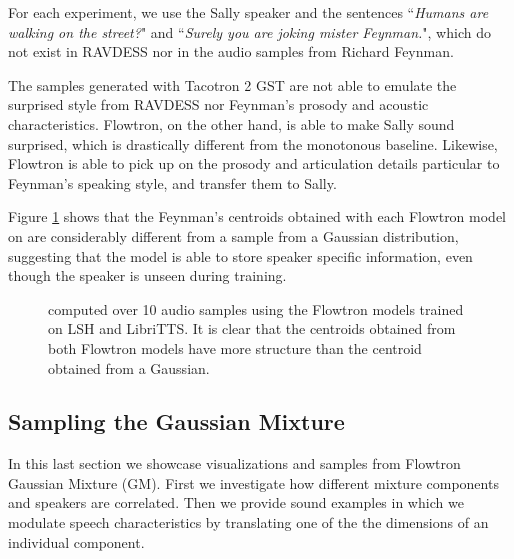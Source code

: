 \documentclass{article}
\begin{document}
For each experiment, we use the Sally speaker and the sentences ``\textit{Humans are walking on the street?}" and ``\textit{Surely you are joking mister Feynman.}", which do not exist in RAVDESS nor in the audio samples from Richard Feynman. 

The samples generated with Tacotron 2 GST are not able to emulate the surprised style from RAVDESS nor Feynman's prosody and acoustic characteristics. Flowtron, on the other hand, is able to make Sally sound surprised, which is drastically different from the monotonous baseline. Likewise, Flowtron is able to pick up on the prosody and articulation details particular to Feynman's speaking style, and transfer them to Sally.

\if
Figure \ref{fig:z_centroids} shows that the Feynman's centroids obtained with each Flowtron model on are considerably different from a sample from a Gaussian distribution, suggesting that the model is able to store speaker specific information, even though the speaker is unseen during training. 

\begin{figure}[!ht]
    \centering
    
    
    \caption{ computed over 10 audio samples using the Flowtron models trained on LSH and LibriTTS. It is clear that the centroids obtained from both Flowtron models have more structure than the centroid obtained from a Gaussian.}
    \label{fig:z_centroids}
\end{figure}
\fi \subsection{Sampling the Gaussian Mixture}\label{sec:sampling_gm}
In this last section we showcase visualizations and samples from Flowtron Gaussian Mixture (GM). First we investigate how different mixture components and speakers are correlated. Then we provide sound examples in which we modulate speech characteristics by translating one of the the dimensions of an individual component.
\end{document}
